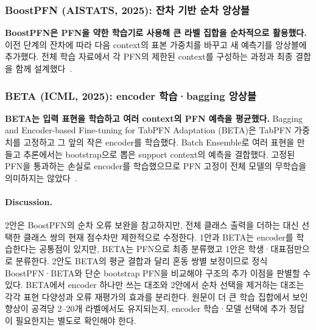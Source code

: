 \subsubsection{BoostPFN (AISTATS, 2025): 잔차 기반 순차 앙상블}
\textbf{BoostPFN은 PFN을 약한 학습기로 사용해 큰 라벨 집합을 순차적으로 활용했다.} 이전 단계의 잔차에 따라 다음 context의 표본 가중치를 바꾸고 새 예측기를 앙상블에 추가했다. 전체 학습 자료에서 각 PFN의 제한된 context를 구성하는 과정과 최종 결합을 함께 설계했다~\cite{boostpfn}.


\subsubsection{BETA (ICML, 2025): encoder 학습·bagging 앙상블}
\textbf{BETA는 입력 표현을 학습하고 여러 context의 PFN 예측을 평균했다.} Bagging and Encoder-based Fine-tuning for TabPFN Adaptation (BETA)은 TabPFN 가중치를 고정하고 그 앞의 작은 encoder를 학습했다. Batch Ensemble로 여러 표현을 만들고 추론에서는 bootstrap으로 뽑은 support context의 예측을 결합했다. 고정된 PFN을 통과하는 손실로 encoder를 학습했으므로 PFN 고정이 전체 모델의 무학습을 의미하지는 않았다~\cite{beta}.


\paragraph{Discussion.}
2안은 BoostPFN의 순차 오류 보완을 참고하지만, 전체 클래스 출력을 더하는 대신 선택한 클래스 쌍의 현재 점수차만 제한적으로 수정한다. 1안과 BETA는 encoder를 학습한다는 공통점이 있지만, BETA는 PFN으로 최종 분류했고 1안은 학생·대표점만으로 분류한다. 2안도 BETA의 평균 결합과 달리 혼동 쌍별 보정이므로 정식 BoostPFN·BETA와 단순 bootstrap PFN을 비교해야 구조의 추가 이점을 판별할 수 있다. BETA에서 encoder 하나만 쓰는 대조와 2안에서 순차 선택을 제거하는 대조는 각각 표현 다양성과 오류 재평가의 효과를 분리한다. 원문이 더 큰 학습 집합에서 보인 향상이 공격당 2--20개 라벨에서도 유지되는지, encoder 학습·모델 선택에 추가 정답이 필요한지는 별도로 확인해야 한다.


